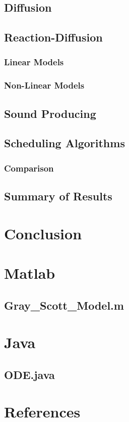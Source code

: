 \documentclass[12pt,a4paper]{report}
\begin{document}
	\section{Diffusion}
		
	\section{Reaction-Diffusion}
		\subsection{Linear Models}
		
		\subsection{Non-Linear Models}

	\section{Sound Producing}

	\section{Scheduling Algorithms}
		\subsection{Comparison}
		
	\section{Summary of Results}

\chapter{Conclusion}
	
	
\appendix
\chapter{Matlab}
\section{Gray\_Scott\_Model.m}
\appendix
\chapter{Java}
\section{ODE.java}
\appendix
\chapter{References}
\end{document}
